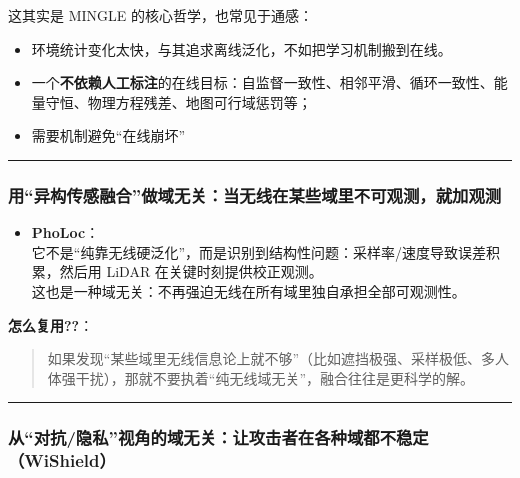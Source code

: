 \documentclass[
]{article}
\begin{document}
这其实是 MINGLE 的核心哲学，也常见于通感：

\begin{itemize}
\item
  环境统计变化太快，与其追求离线泛化，不如把学习机制搬到在线。
\item
  一个\textbf{不依赖人工标注}的在线目标：自监督一致性、相邻平滑、循环一致性、能量守恒、物理方程残差、地图可行域惩罚等；
\item
  需要机制避免``在线崩坏''
\end{itemize}

\begin{center}\rule{0.5\linewidth}{0.5pt}\end{center}

\subsubsection{用``异构传感融合''做域无关：当无线在某些域里不可观测，就加观测}\label{ux7528ux5f02ux6784ux4f20ux611fux878dux5408ux505aux57dfux65e0ux5173ux5f53ux65e0ux7ebfux5728ux67d0ux4e9bux57dfux91ccux4e0dux53efux89c2ux6d4bux5c31ux52a0ux89c2ux6d4b}

\begin{itemize}
\item
  \textbf{PhoLoc}：\\
  它不是``纯靠无线硬泛化''，而是识别到结构性问题：采样率/速度导致误差积累，然后用
  LiDAR 在关键时刻提供校正观测。\\
  这也是一种域无关：不再强迫无线在所有域里独自承担全部可观测性。
\end{itemize}

\textbf{怎么复用??}：

\begin{quote}
如果发现``某些域里无线信息论上就不够''（比如遮挡极强、采样极低、多人体强干扰），那就不要执着``纯无线域无关''，融合往往是更科学的解。
\end{quote}

\begin{center}\rule{0.5\linewidth}{0.5pt}\end{center}

\subsubsection{从``对抗/隐私''视角的域无关：让攻击者在各种域都不稳定（WiShield）}\label{ux4eceux5bf9ux6297ux9690ux79c1ux89c6ux89d2ux7684ux57dfux65e0ux5173ux8ba9ux653bux51fbux8005ux5728ux5404ux79cdux57dfux90fdux4e0dux7a33ux5b9awishield}
\end{document}
